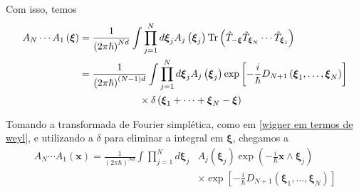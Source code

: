 \documentclass[
	12pt,
	oneside,			%
	a4paper,			%
	english,			%
	brazil				%
	]{abntex2}
\theoremstyle{definition}
\begin{document}
Com isso, temos
\begin{equation}
    \begin{aligned}
        A_N \cdots A_1 \left(\boldsymbol{\xi}\right) &= \frac{1}{\left(2 \pi \hbar\right)^{Nd}}\int \prod_{j=1}^N d \boldsymbol{\xi}_j A_j \left(\boldsymbol{\xi}_j\right) \Tr \left(\hat{T}_{-\boldsymbol{\xi}} \hat{T}_{\boldsymbol{\xi}_N}\cdots \hat{T}_{\boldsymbol{\xi}_1}\right) \\
        & = \frac{1}{\left(2 \pi \hbar\right)^{(N-1)d}}\int \prod_{j=1}^N d \boldsymbol{\xi}_j A_j \left(\boldsymbol{\xi}_j\right) \exp\left[-\frac{i}{\hbar}D_{N+1}\left(\boldsymbol{\xi}_1,\ldots,\boldsymbol{\xi}_N\right)\right] \\ & \qquad \qquad \qquad  \times\delta\left(\boldsymbol{\xi}_1+\cdots+\boldsymbol{\xi}_N-\boldsymbol{\xi}\right)
    \end{aligned}
\end{equation}

Tomando a transformada de Fourier simplética, como em \eqref{wigner em termos de weyl}, e utilizando a $\delta$ para eliminar a integral em $\boldsymbol{\xi}$, chegamos a
\begin{equation}
    \begin{aligned}
        A_N \cdots A_1 \left(\mathbf{x}\right) = \frac{1}{\left(2 \pi \hbar\right)^{Nd}}\int \prod_{j=1}^N d \boldsymbol{\xi}_j & A_j \left(\boldsymbol{\xi}_j\right) \exp\left(-\frac{i}{\hbar} \mathbf{x}\wedge\boldsymbol{\xi}_j\right) \\ &\times \exp\left[-\frac{i}{\hbar}D_{N+1}\left(\boldsymbol{\xi}_1,\ldots,\boldsymbol{\xi}_N\right)\right] 
    \end{aligned}
\end{equation}
\end{document}
